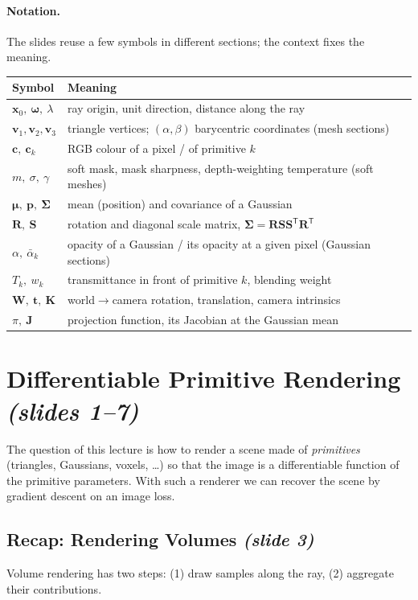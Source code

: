 \documentclass[11pt,a4paper]{article}
\newcommand{\sr}[1]{\texorpdfstring{\emph{(#1)}}{(#1)}}
\newcommand{\T}{^{\mathsf T}}
\newcommand{\abar}{\bar\alpha}
\theoremstyle{definition}
\theoremstyle{plain}
\theoremstyle{remark}
\begin{document}
\paragraph{Notation.} The slides reuse a few symbols in different sections; the context fixes the meaning.
\begin{center}
\small
\begin{tabular}{@{}p{3.6cm}p{11.3cm}@{}}
\toprule
Symbol & Meaning \\ \midrule
$\bm x_0,\ \bm\omega,\ \lambda$ & ray origin, unit direction, distance along the ray \\
$\bm v_1,\bm v_2,\bm v_3$ & triangle vertices; $(\alpha,\beta)$ barycentric coordinates (mesh sections) \\
$\bm c,\ \bm c_k$ & RGB colour of a pixel / of primitive $k$ \\
$m,\ \sigma,\ \gamma$ & soft mask, mask sharpness, depth-weighting temperature (soft meshes) \\
$\bm\mu,\ \bm p,\ \bm\Sigma$ & mean (position) and covariance of a Gaussian \\
$\bm R,\ \bm S$ & rotation and diagonal scale matrix, $\bm\Sigma=\bm R\bm S\bm S\T\bm R\T$ \\
$\alpha,\ \abar_k$ & opacity of a Gaussian / its opacity at a given pixel (Gaussian sections) \\
$T_k,\ w_k$ & transmittance in front of primitive $k$, blending weight \\
$\bm W,\ \bm t,\ \bm K$ & world$\to$camera rotation, translation, camera intrinsics \\
$\pi,\ \bm J$ & projection function, its Jacobian at the Gaussian mean \\
\bottomrule
\end{tabular}
\end{center}
\newpage
\section{Differentiable Primitive Rendering \sr{slides 1--7}}
The question of this lecture is how to render a scene made of \emph{primitives} (triangles, Gaussians, voxels, \dots) so that the image is a differentiable function of the primitive parameters. With such a renderer we can recover the scene by gradient descent on an image loss.

\subsection{Recap: Rendering Volumes \sr{slide 3}}
Volume rendering has two steps: (1) draw samples along the ray, (2) aggregate their contributions.
\end{document}
